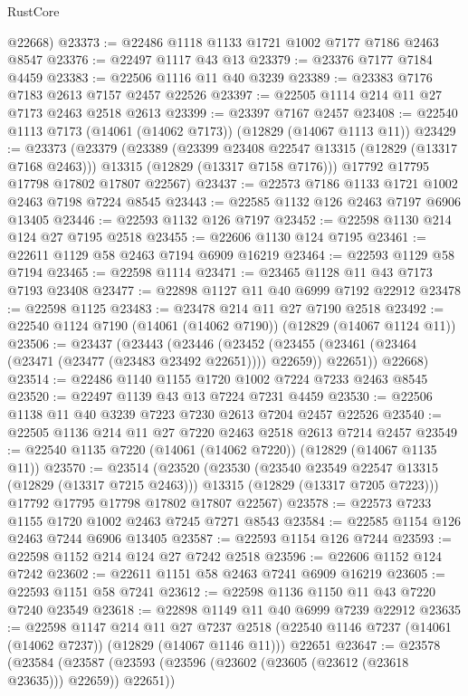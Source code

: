 \begin{lexlean}{RustCore}
\begin{coremodule}
      @22668)
@23373 := @22486 @1118 @1133 @1721 @1002 @7177 @7186 @2463 @8547
@23376 := @22497 @1117 @43 @13
@23379 := @23376 @7177 @7184 @4459
@23383 := @22506 @1116 @11 @40 @3239
@23389 := @23383 @7176 @7183 @2613 @7157 @2457 @22526
@23397 := @22505 @1114 @214 @11 @27 @7173 @2463 @2518 @2613
@23399 := @23397 @7167 @2457
@23408 := @22540 @1113 @7173 (@14061 (@14062 @7173)) (@12829 (@14067 @1113 @11))
@23429 := @23373
    (@23379
      (@23389
        (@23399 @23408 @22547 @13315 (@12829 (@13317 @7168 @2463)))
        @13315
        (@12829 (@13317 @7158 @7176)))
      @17792
      @17795
      @17798
      @17802
      @17807
      @22567)
@23437 := @22573 @7186 @1133 @1721 @1002 @2463 @7198 @7224 @8545
@23443 := @22585 @1132 @126 @2463 @7197 @6906 @13405
@23446 := @22593 @1132 @126 @7197
@23452 := @22598 @1130 @214 @124 @27 @7195 @2518
@23455 := @22606 @1130 @124 @7195
@23461 := @22611 @1129 @58 @2463 @7194 @6909 @16219
@23464 := @22593 @1129 @58 @7194
@23465 := @22598 @1114
@23471 := @23465 @1128 @11 @43 @7173 @7193 @23408
@23477 := @22898 @1127 @11 @40 @6999 @7192 @22912
@23478 := @22598 @1125
@23483 := @23478 @214 @11 @27 @7190 @2518
@23492 := @22540 @1124 @7190 (@14061 (@14062 @7190)) (@12829 (@14067 @1124 @11))
@23506 := @23437
    (@23443
      (@23446
        (@23452 (@23455 (@23461 (@23464 (@23471 (@23477 (@23483 @23492 @22651)))) @22659)) @22651))
      @22668)
@23514 := @22486 @1140 @1155 @1720 @1002 @7224 @7233 @2463 @8545
@23520 := @22497 @1139 @43 @13 @7224 @7231 @4459
@23530 := @22506 @1138 @11 @40 @3239 @7223 @7230 @2613 @7204 @2457 @22526
@23540 := @22505 @1136 @214 @11 @27 @7220 @2463 @2518 @2613 @7214 @2457
@23549 := @22540 @1135 @7220 (@14061 (@14062 @7220)) (@12829 (@14067 @1135 @11))
@23570 := @23514
    (@23520
      (@23530
        (@23540 @23549 @22547 @13315 (@12829 (@13317 @7215 @2463)))
        @13315
        (@12829 (@13317 @7205 @7223)))
      @17792
      @17795
      @17798
      @17802
      @17807
      @22567)
@23578 := @22573 @7233 @1155 @1720 @1002 @2463 @7245 @7271 @8543
@23584 := @22585 @1154 @126 @2463 @7244 @6906 @13405
@23587 := @22593 @1154 @126 @7244
@23593 := @22598 @1152 @214 @124 @27 @7242 @2518
@23596 := @22606 @1152 @124 @7242
@23602 := @22611 @1151 @58 @2463 @7241 @6909 @16219
@23605 := @22593 @1151 @58 @7241
@23612 := @22598 @1136 @1150 @11 @43 @7220 @7240 @23549
@23618 := @22898 @1149 @11 @40 @6999 @7239 @22912
@23635 := @22598
    @1147
    @214
    @11
    @27
    @7237
    @2518
    (@22540 @1146 @7237 (@14061 (@14062 @7237)) (@12829 (@14067 @1146 @11)))
    @22651
@23647 := @23578
    (@23584
      (@23587 (@23593 (@23596 (@23602 (@23605 (@23612 (@23618 @23635))) @22659)) @22651))

\end{coremodule}
\end{lexlean}
